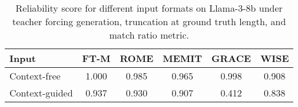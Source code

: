 
\begin{table}[t]
\centering
\setlength{\tabcolsep}{3.5pt}
\renewcommand{\arraystretch}{0.85}
\begin{adjustbox}{max width=\linewidth} 
\begin{tabular}{lccccc}
\toprule
Input & FT-M  & ROME  & MEMIT  & GRACE  & WISE  \\
\midrule
Context-free & \num{1.000}  & \num{0.985}  & \num{0.965} & \num{0.998}  & \num{0.908}  \\
Context-guided & \num{0.937}  & \num{0.930} & \num{0.907} & \num{0.412} & \num{0.838} \\
\bottomrule 
\end{tabular}
\end{adjustbox}
\caption{Reliability score for different input formats on Llama-3-8b under teacher forcing generation, truncation at ground truth length, and match ratio metric.}
\label{tab:metrics_llama3_prompt}
\end{table}
